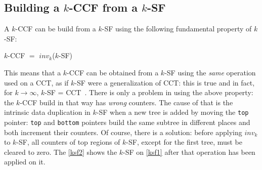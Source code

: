 \documentclass[a4paper,10pt]{report}
\begin{document}
\subsection{Building a $k$-CCF from a $k$-SF}

A $k$-CCF can be build from a $k$-SF using the following fundamental property of $k$-SF:
\begin{center}
$k$-CCF $=$ $inv_k$($k$-SF)
\end{center}
This means that a $k$-CCF can be obtained from a $k$-SF using the \emph{same} operation
used on a CCT, as if $k$-SF were a generalization of CCT: this is true and in fact, for $k\rightarrow \infty$, $k$-SF = CCT~\cite{kccf}.
There is only a problem in using the above property: the $k$-CCF build in that way has \emph{wrong} counters. The cause of that is the intrinsic data duplication in $k$-SF when a new tree is added by moving the \verb|top| pointer: \verb|top| and \verb|bottom| pointers build the same subtree in different places and both increment their counters. Of course, there is a solution: before applying $inv_k$ to $k$-SF, all counters of top regions of $k$-SF, except for the first tree, must be cleared to zero.
The \cref{ksf2} shows the $k$-SF on \cref{ksf1}
after that operation has been applied on it.
\end{document}
